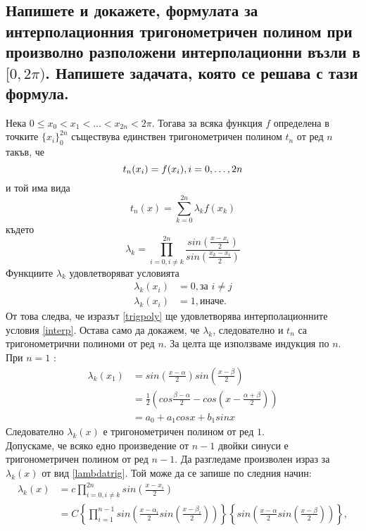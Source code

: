 \documentclass[12pt]{article}
\numberwithin{equation}{subsection}
\numberwithin{theorem}{subsection}
\numberwithin{definition}{subsection}
\numberwithin{corollary}{subsection}
\begin{document}
\subsection{Напишете и докажете, формулата за интерполационния тригонометричен полином при произволно разположени интерполационни възли в $[0, 2\pi)$. Напишете задачата, която се решава с тази формула.}
  \theorem Нека $0\leq x_0<x_1<\ldots<x_{2n}<2\pi$. Тогава за всяка функция $f$ определена в точките $\{x_i\}_0^{2n}$ съществува единствен тригонометричен полином $t_n$ от ред $n$ такъв, че
  \begin{equation}\label{interp}
    t_n(x_i)=f(x_i), \hfill i=0,\ldots,2n
  \end{equation}
  и той има вида
  \begin{equation}\label{trigpoly}
    t_n(x) = \sum_{k=0}^{2n}\lambda_kf(x_k)
  \end{equation}
  където
  \begin{equation}\label{lambdatrig}
    \lambda_k=\prod_{i=0,i\neq k}^{2n}\frac{sin\left(\frac{x-x_i}{2}\right)}{sin\left(\frac{x_k-x_i}{2}\right)}
  \end{equation}
  \proof
  Функциите $\lambda_k$ удовлетворяват условията
  \begin{align*}
    \lambda_k(x_i)&=0, \text{за } i\neq j\\
    \lambda_k(x_i)&=1, \text{иначе}.
  \end{align*}
  От това следва, че изразът \ref{trigpoly} ще удовлетворява интерполационните условия \ref{interp}. Остава само да докажем, че $\lambda_k$, следователно и $t_n$ са тригонометрични полиноми от ред $n$. За целта ще използваме индукция по $n$.\\
  При $n=1$ :
  \begin{align*}
     \lambda_k(x_1) &= sin\left(\frac{x-\alpha}{2}\right)sin\left(\frac{x-\beta}{2}\right) \\
     &= \frac{1}{2}\left(cos\frac{\beta-\alpha}{2}-cos\left(x-\frac{\alpha+\beta}{2}\right)\right) \\
     &= \boxed{a_0+a_1cosx+b_1sinx}
  \end{align*}
  Следователно $\lambda_k(x)$ е тригонометричен полином от ред $1$.\\
  Допускаме, че всяко едно произведение от $n-1$ двойки синуси е тригонометричен полином от ред $n-1$. Да разгледаме произволен израз за $\lambda_k(x)$ от вид \ref{lambdatrig}. Той може да се запише по следния начин:
  \begin{align*}
    \lambda_k(x)&=c\prod_{i=0, i\neq k}^{2n}sin\left(\frac{x-x_i}{2}\right)\\
    &=C\left\{\prod_{i=1}^{n-1}sin\left(\frac{x-\alpha_i}{2}sin\left(\frac{x-\beta_i}{2}\right)\right)\right\}\left\{sin\left(\frac{x-\alpha}{2}sin\left(\frac{x-\beta}{2}\right)\right)\right\},
  \end{align*}
\end{document}
